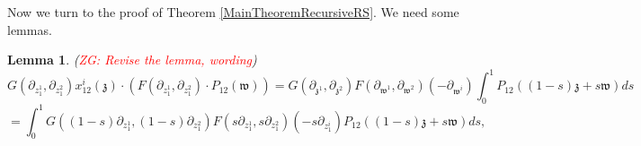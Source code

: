 \documentclass[11pt]{amsart}
\newtheorem{lem}[thm]{Lemma}
\theoremstyle{definition}
\theoremstyle{remark}
\numberwithin{equation}{section}
\newcommand{\Gui}[1]{(\textcolor{red}{ZG: #1})}
\begin{document}
Now we turn to the proof of Theorem \ref{MainTheoremRecursiveRS}. We need some lemmas.
\begin{lem}\label{IntegralXP}
\Gui{Revise the lemma, wording}
  $$
G(\partial_{z^1_{1}},\partial_{z^2_{1}})x^i_{12}(\mathfrak{z})\cdot\left( F(\partial_{z^1_{1}},\partial_{z^2_{1}})\cdot P_{12}(\mathfrak{w})\right)=G(\partial_{\mathfrak{z}^1},\partial_{\mathfrak{z}^2})F(\partial_{\mathfrak{w}^1},\partial_{\mathfrak{w}^2})(-\partial_{\mathfrak{w}^i})\int^1_0P_{12}\left((1-s)\mathfrak{z}+s\mathfrak{w}\right)ds
  $$
  $$
  =\int^1_0G\left((1-s)\partial_{z^1_1},(1-s)\partial_{z^2_1}\right)F\left(s\partial_{z^1_1},s\partial_{z^2_1}\right)(-s\partial_{z^i_1})P_{12}\left((1-s)\mathfrak{z}+s\mathfrak{w}\right)ds,
  $$
  \iffalse
$$
G(\partial_{z^1_{1}},\partial_{z^2_{1}})P_{12}(\mathfrak{z})\cdot\left( F(\partial_{z^1_{1}},\partial_{z^2_{1}})\cdot x^i_{12}(\mathfrak{w})\right)=G(\partial_{\mathfrak{z}^1},\partial_{\mathfrak{z}^2})F(\partial_{\mathfrak{w}^1},\partial_{\mathfrak{w}^2})(-\partial_{\mathfrak{z}^i})\int^1_0P_{12}\left((1-s)\mathfrak{z}+s\mathfrak{w}\right)ds
  $$
  $$
  =\int^1_0G\left((1-s)\partial_{z^1_1},(1-s)\partial_{z^2_1}\right)F\left(s\partial_{z^1_1},s\partial_{z^2_1}\right)(-(1-s)\partial_{z^i_1})P_{12}\left((1-s)\mathfrak{z}+s\mathfrak{w}\right)ds.
  $$
  \fi
\end{lem}
\end{document}
